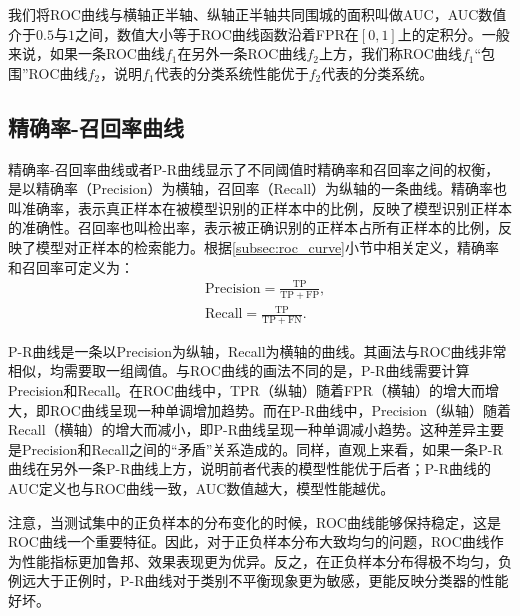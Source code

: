 我们将ROC曲线与横轴正半轴、纵轴正半轴共同围城的面积叫做AUC，AUC数值介于$0.5$与$1$之间，数值大小等于ROC曲线函数沿着FPR在$[0,1]$上的定积分。一般来说，如果一条ROC曲线$f_1$在另外一条ROC曲线$f_2$上方，我们称ROC曲线$f_1$“包围”ROC曲线$f_2$，说明$f_1$代表的分类系统性能优于$f_2$代表的分类系统。
\subsection{精确率-召回率曲线}\label{subsec:pr_curve}
精确率-召回率曲线或者P-R曲线显示了不同阈值时精确率和召回率之间的权衡，是以精确率（Precision）为横轴，召回率（Recall）为纵轴的一条曲线。精确率也叫准确率，表示真正样本在被模型识别的正样本中的比例，反映了模型识别正样本的准确性。召回率也叫检出率，表示被正确识别的正样本占所有正样本的比例，反映了模型对正样本的检索能力。根据\ref{subsec:roc_curve}小节中相关定义，精确率和召回率可定义为：
\begin{align}
	&\mathrm{Precision}=\frac{\mathrm{TP}}{\mathrm{TP}+\mathrm{FP}},\\
	&\mathrm{Recall}=\frac{\mathrm{TP}}{\mathrm{TP}+\mathrm{FN}}.
\end{align}


P-R曲线是一条以Precision为纵轴，Recall为横轴的曲线。其画法与ROC曲线非常相似，均需要取一组阈值。与ROC曲线的画法不同的是，P-R曲线需要计算Precision和Recall。在ROC曲线中，TPR（纵轴）随着FPR（横轴）的增大而增大，即ROC曲线呈现一种单调增加趋势。而在P-R曲线中，Precision（纵轴）随着Recall（横轴）的增大而减小，即P-R曲线呈现一种单调减小趋势。这种差异主要是Precision和Recall之间的“矛盾”关系造成的。同样，直观上来看，如果一条P-R曲线在另外一条P-R曲线上方，说明前者代表的模型性能优于后者；P-R曲线的AUC定义也与ROC曲线一致，AUC数值越大，模型性能越优。

注意，当测试集中的正负样本的分布变化的时候，ROC曲线能够保持稳定，这是ROC曲线一个重要特征。因此，对于正负样本分布大致均匀的问题，ROC曲线作为性能指标更加鲁邦、效果表现更为优异。反之，在正负样本分布得极不均匀，负例远大于正例时，P-R曲线对于类别不平衡现象更为敏感，更能反映分类器的性能好坏。

